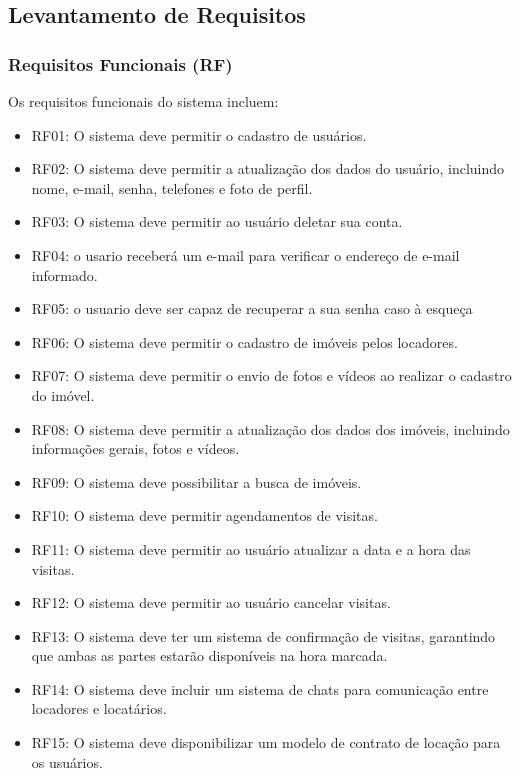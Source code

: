 \subsection{Levantamento de Requisitos}

\subsubsection{Requisitos Funcionais (RF)}
Os requisitos funcionais do sistema incluem:
\begin{itemize}
    \item RF01: O sistema deve permitir o cadastro de usuários.
    \item RF02: O sistema deve permitir a atualização dos dados do usuário, incluindo nome, e-mail, senha, telefones e foto de perfil.
    \item RF03: O sistema deve permitir ao usuário deletar sua conta.
    \item RF04: o usario receberá um e-mail para verificar o endereço de e-mail informado.
    \item RF05: o usuario deve ser capaz de recuperar a sua senha caso à esqueça
    \item RF06: O sistema deve permitir o cadastro de imóveis pelos locadores.
    \item RF07: O sistema deve permitir o envio de fotos e vídeos ao realizar o cadastro do imóvel.
    \item RF08: O sistema deve permitir a atualização dos dados dos imóveis, incluindo informações gerais, fotos e vídeos.
    \item RF09: O sistema deve possibilitar a busca de imóveis.
    \item RF10: O sistema deve permitir agendamentos de visitas.
    \item RF11: O sistema deve permitir ao usuário atualizar a data e a hora das visitas.
    \item RF12: O sistema deve permitir ao usuário cancelar visitas.
    \item RF13: O sistema deve ter um sistema de confirmação de visitas, garantindo que ambas as partes estarão disponíveis na hora marcada.
    \item RF14: O sistema deve incluir um sistema de chats para comunicação entre locadores e locatários.
    \item RF15: O sistema deve disponibilizar um modelo de contrato de locação para os usuários.
\end{itemize}


